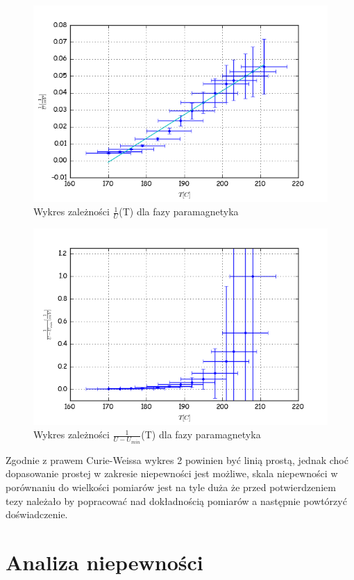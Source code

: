 \documentclass[a4paper,10pt]{article}
\begin{document}
\begin{figure}[H]
  \includegraphics{./Curie_odwrotnosc.png}
  \caption{Wykres zależności $\frac{1}{U}$(T) dla fazy paramagnetyka}
\end{figure}
\begin{figure}[H]
  \includegraphics{./Curie_odjete.png}
  \caption{Wykres zależności $\frac{1}{U-U_{min}}$(T) dla fazy paramagnetyka}
\end{figure}

Zgodnie z prawem Curie-Weissa wykres 2 powinien być linią prostą, jednak choć dopasowanie prostej w zakresie niepewności jest możliwe, skala niepewności w porównaniu do wielkości pomiarów jest na tyle duża że przed potwierdzeniem tezy należało by popracować nad dokładnością pomiarów a następnie powtórzyć doświadczenie.
\section{Analiza niepewności}
\end{document}
